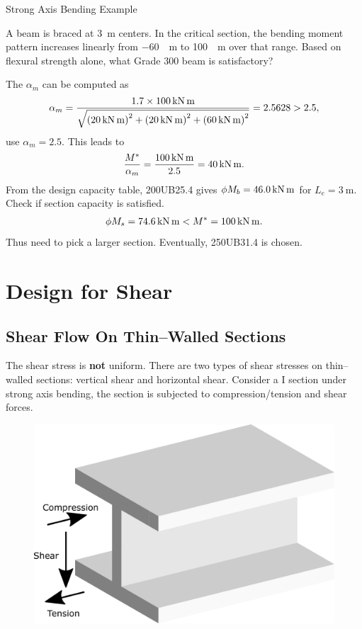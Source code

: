 \begin{exmp}
Strong Axis Bending Example

A beam is braced at \SI{3}{\meter} centers. In the critical section, the bending moment pattern increases linearly from \SI{-60}{\kn\meter} to \SI{100}{\kn\meter} over that range. Based on flexural strength alone, what Grade 300 beam is satisfactory?
\begin{figure}[H]

\end{figure}
\end{exmp}
\begin{solution}
The $\alpha_m$ can be computed as
\begin{gather*}
\alpha_m=\dfrac{1.7\times\SI{100}{\kilo\newton\meter}}{\sqrt{\left(\SI{20}{\kilo\newton\meter}\right)^2+\left(\SI{20}{\kilo\newton\meter}\right)^2+\left(\SI{60}{\kilo\newton\meter}\right)^2}}=2.5628>2.5,
\end{gather*}
use $\alpha_m=2.5$. This leads to
\begin{gather*}
\dfrac{M^*}{\alpha_m}=\dfrac{\SI{100}{\kilo\newton\meter}}{2.5}=\SI{40}{\kilo\newton\meter}.
\end{gather*}
From the design capacity table, 200UB25.4 gives $\phi{}M_b=\SI{46.0}{\kilo\newton\meter}$ for $L_e=\SI{3}{\meter}$. Check if section capacity is satisfied.
\begin{gather*}
\phi{}M_s=\SI{74.6}{\kilo\newton\meter}<M^*=\SI{100}{\kilo\newton\meter}.
\end{gather*}
Thus need to pick a larger section. Eventually, 250UB31.4 is chosen.
\end{solution}
\section{Design for Shear}
\subsection{Shear Flow On Thin--Walled Sections}
The shear stress is \textbf{not} uniform. There are two types of shear stresses on thin--walled sections: vertical shear and horizontal shear. Consider a I section under strong axis bending, the section is subjected to compression/tension and shear forces.
\begin{figure}[H]
\centering
\includegraphics[width=.7\textwidth]{PIC/CH05/SFA}
\end{figure}
